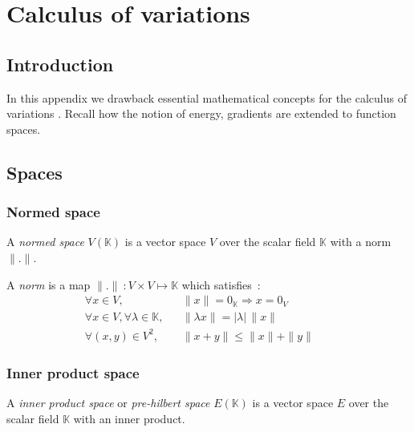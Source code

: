 
\chapter{Calculus of variations}
\label{chp:variation}

\section{Introduction}
In this appendix we drawback essential mathematical concepts for the calculus of variations \cite{Abraham2002}.
Recall how the notion of energy, gradients are extended to function spaces.



\section{Spaces}

\subsection{Normed space}
A \emph{normed space} $V(\mathbb{K})$ is a vector space $V$ over the scalar field $\mathbb{K}$ with a norm $\|.\|$.

A \emph{norm} is a map $\| . \|~: V \times V \longmapsto \mathbb{K}$ which satisfies~:
\begin{subequations}
\begin{align}
	&\forall x \in V, 							&& \|x\| = 0_\mathbb{K} \Rightarrow x = 0_V&&&\\
	&\forall x \in V, \forall \lambda \in \mathbb{K}, 	&& \|\lambda x\| = |\lambda| \,\|x\|&&&\\
	&\forall (x,y) \in V^2, 						&& \|x + y\| \leqslant \|x\| + \|y\|&&&
\end{align}
\end{subequations}


\subsection{Inner product space}
A \emph{inner product space} or \emph{pre-hilbert space} $E(\mathbb{K})$ is a vector space $E$ over the scalar field $\mathbb{K}$ with an inner product.

